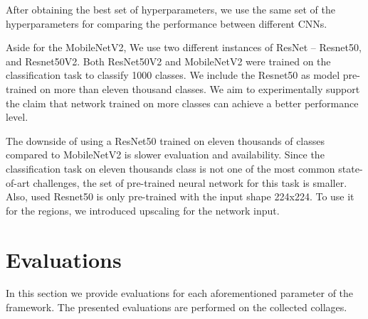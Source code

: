 After obtaining the best set of hyperparameters, we use the same set of the hyperparameters for comparing the performance between different CNNs.

Aside for the MobileNetV2, We use two different instances of ResNet -- Resnet50, and Resnet50V2. Both ResNet50V2 and MobileNetV2 were trained on the classification task to classify 1000 classes. We include the Resnet50 as model pre-trained on more than eleven thousand classes. We aim to experimentally support the claim that network trained on more classes can achieve a better performance level. 

The downside of using a ResNet50 trained on eleven thousands of classes compared to MobileNetV2 is slower evaluation and availability. Since the classification task on eleven thousands class is not one of the most common state-of-art challenges, the set of pre-trained neural network for this task is smaller. Also, used Resnet50 is only pre-trained with the input shape 224x224. To use it for the regions, we introduced upscaling for the network input. 









\chapter{Evaluations}

In this section we provide evaluations for each aforementioned parameter of the framework. The presented evaluations are performed on the collected collages.

